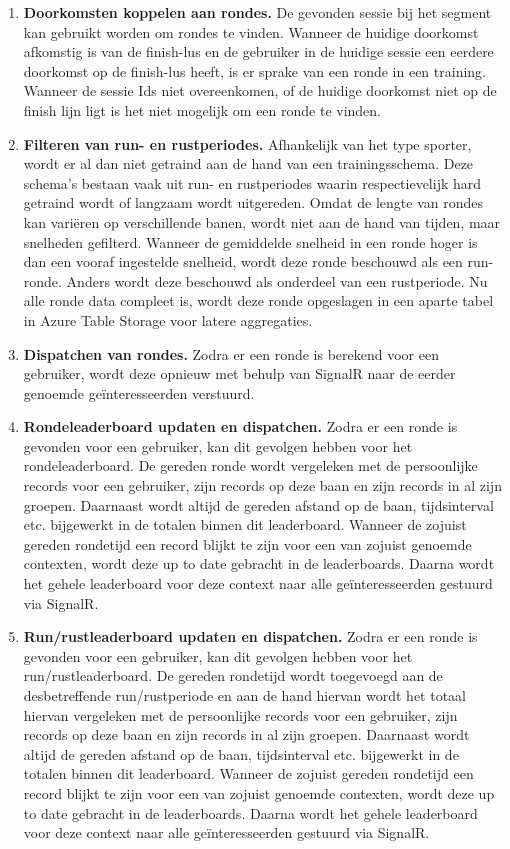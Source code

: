 \begin{enumerate}
\item \textbf{Doorkomsten koppelen aan rondes.}
De gevonden sessie bij het segment kan gebruikt worden om rondes te vinden. Wanneer de huidige doorkomst afkomstig is van de finish-lus en de gebruiker in de huidige sessie een eerdere doorkomst op de finish-lus heeft, is er sprake van een ronde in een training. 
Wanneer de sessie Ids niet overeenkomen, of de huidige doorkomst niet op de finish lijn ligt is het niet mogelijk om een ronde te vinden.

\item \textbf{Filteren van run- en rustperiodes.}
Afhankelijk van het type sporter, wordt er al dan niet getraind aan de hand van een trainingsschema. Deze schema's bestaan vaak uit run- en rustperiodes waarin respectievelijk hard getraind wordt of langzaam wordt uitgereden. Omdat de lengte van rondes kan variëren op verschillende banen, wordt niet aan de hand van tijden, maar snelheden gefilterd. Wanneer de gemiddelde snelheid in een ronde hoger is dan een vooraf ingestelde snelheid, wordt deze ronde beschouwd als een run-ronde. Anders wordt deze beschouwd als onderdeel van een rustperiode. Nu alle ronde data compleet is, wordt deze ronde opgeslagen in een aparte tabel in Azure Table Storage voor latere aggregaties.

\item \textbf{Dispatchen van rondes.}
Zodra er een ronde is berekend voor een gebruiker, wordt deze opnieuw met behulp van SignalR naar de eerder genoemde geïnteresseerden verstuurd.

\item \textbf{Rondeleaderboard updaten en dispatchen.}
Zodra er een ronde is gevonden voor een gebruiker, kan dit gevolgen hebben voor het rondeleaderboard. De gereden ronde wordt vergeleken met de persoonlijke records voor een gebruiker, zijn records op deze baan en zijn records in al zijn groepen. Daarnaast wordt altijd de gereden afstand op de baan, tijdsinterval etc. bijgewerkt in de totalen binnen dit leaderboard. Wanneer de zojuist gereden rondetijd een record blijkt te zijn voor een van zojuist genoemde contexten, wordt deze up to date gebracht in de leaderboards. Daarna wordt het gehele leaderboard voor deze context naar alle geïnteresseerden gestuurd via SignalR.

\item \textbf{Run/rustleaderboard updaten en dispatchen.}
Zodra er een ronde is gevonden voor een gebruiker, kan dit gevolgen hebben voor het run/rustleaderboard. De gereden rondetijd wordt toegevoegd aan de desbetreffende run/rustperiode en aan de hand hiervan wordt het totaal hiervan vergeleken met de persoonlijke records voor een gebruiker, zijn records op deze baan en zijn records in al zijn groepen. Daarnaast wordt altijd de gereden afstand op de baan, tijdsinterval etc. bijgewerkt in de totalen binnen dit leaderboard. Wanneer de zojuist gereden rondetijd een record blijkt te zijn voor een van zojuist genoemde contexten, wordt deze up to date gebracht in de leaderboards. Daarna wordt het gehele leaderboard voor deze context naar alle geïnteresseerden gestuurd via SignalR.


\end{enumerate}
